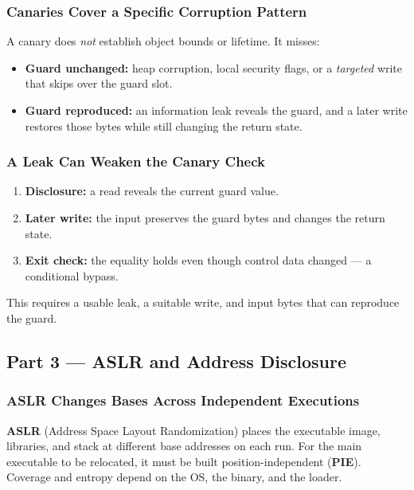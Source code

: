 \documentclass[hidelinks]{article}
\begin{document}
\subsubsection{Canaries Cover a Specific Corruption Pattern}

A canary does \emph{not} establish object bounds or lifetime. It misses:
\begin{itemize}
    \item \textbf{Guard unchanged:} heap corruption, local security flags, or a \emph{targeted} write that skips over the guard slot.
    \item \textbf{Guard reproduced:} an information leak reveals the guard, and a later write restores those bytes while still changing the return state.
\end{itemize}

\subsubsection{A Leak Can Weaken the Canary Check}

\begin{enumerate}
    \item \textbf{Disclosure:} a read reveals the current guard value.
    \item \textbf{Later write:} the input preserves the guard bytes and changes the return state.
    \item \textbf{Exit check:} the equality holds even though control data changed --- a conditional bypass.
\end{enumerate}
This requires a usable leak, a suitable write, and input bytes that can reproduce the guard.

\subsection{Part 3 --- ASLR and Address Disclosure}

\subsubsection{ASLR Changes Bases Across Independent Executions}

\textbf{ASLR} (Address Space Layout Randomization) places the executable image, libraries, and stack at different base addresses on each run. For the main executable to be relocated, it must be built position-independent (\textbf{PIE}). Coverage and entropy depend on the OS, the binary, and the loader.
\end{document}
